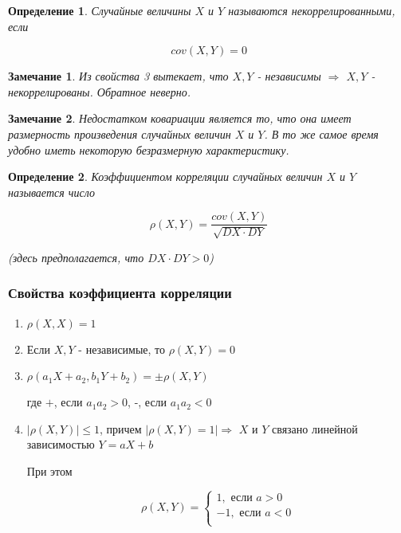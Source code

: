 \documentclass[a4paper, 14pt]{report}
\newtheorem{defenition}{Определение}[section]
\newtheorem{note}{Замечание}[section]
\begin{document}
\begin{defenition}
    Случайные величины $X$ и $Y$ называются некоррелированными, если

    $$
    cov(X,Y) = 0
    $$
\end{defenition}

\begin{note}
    Из свойства 3 вытекает, что $X,Y$ - независимы $\Rightarrow$ $X,Y$ - некоррелированы. Обратное неверно.
\end{note}

\begin{note}
    Недостатком ковариации является то, что она имеет размерность произведения случайных величин $X$ и $Y$. В то же самое время удобно иметь некоторую безразмерную характеристику.
\end{note}

\begin{defenition}
    Коэффициентом корреляции случайных величин $X$ и $Y$ называется число

    $$
    \rho(X,Y) = \frac{cov(X,Y)}{\sqrt{DX \cdot DY}}
    $$

    (здесь предполагается, что $DX \cdot DY > 0$)
\end{defenition}

\subsubsection{Свойства коэффициента корреляции}

\begin{enumerate}
    \item $\rho(X,X) = 1$
    \item Если $X,Y$ - независимые, то $\rho(X,Y) = 0$
    \item $\rho(a_1X + a_2, b_1 Y + b_2) = \pm\rho(X,Y)$

        где $+$, если $a_1a_2 > 0$, -, если $a_1 a_2 < 0$

    \item $|\rho(X,Y)| \le 1$, причем $|\rho(X,Y) = 1| \Rightarrow$ $X$ и $Y$ связано линейной зависимостью $Y=aX+b$

        При этом

        $$
        \rho(X,Y) =
        \begin{cases}
            1, \text{ если } a > 0 \\
            -1, \text{ если } a< 0 \\
        \end{cases}
        $$
\end{enumerate}
\end{document}
